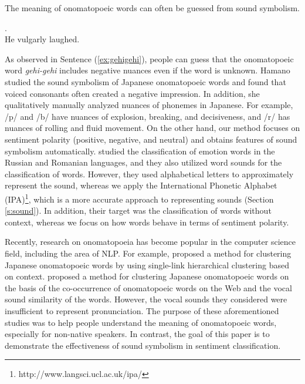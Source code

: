 \documentclass[english]{jnlp_1.4}
\begin{document}
The meaning of onomatopoeic words can often be guessed from sound symbolism.
\begin{exe}
	.\\
	\hspace{5mm}He \hspace{5mm}vulgarly \hspace{2mm}laughed.
	\label{ex:gehigehi}
\end{exe}
As observed in Sentence (\ref{ex:gehigehi}), people can guess that the onomatopoeic word {\it gehi-gehi} includes negative nuances even if the word is unknown.
Hamano \cite{hamano1998} studied the sound symbolism of Japanese onomatopoeic words and found that
voiced consonants often created a negative impression.
In addition, she qualitatively manually analyzed nuances of phonemes in Japanese.
For example, /p/ and /b/ have nuances of explosion, breaking, and decisiveness, and /r/ has nuances of rolling and fluid movement.
On the other hand, our method focuses on sentiment polarity (positive, negative, and neutral) and obtains features of sound symbolism automatically.
\cite{sokolova2009} studied the classification of emotion words in the Russian and Romanian languages, and
they also utilized word sounds for the classification of words.
However, they used alphabetical letters to approximately represent the sound,
whereas we apply the International Phonetic Alphabet (IPA)\footnote{http://www.langsci.ucl.ac.uk/ipa/},
which is a more accurate approach to representing sounds (Section \ref{s:sound}).
In addition, their target was the classification of words without context, whereas we focus on how words behave in terms of sentiment polarity.

Recently, research on onomatopoeia has become popular in the  computer science field, including the area of NLP.
For example, \cite{komiya2011} proposed a method for clustering Japanese onomatopoeic words by using single-link hierarchical clustering based on context.
\cite{ichioka2008} proposed a method for clustering Japanese onomatopoeic words on the basis of the co-occurrence of onomatopoeic words on the Web and the vocal sound similarity of the words.
However, the vocal sounds they considered were insufficient to represent pronunciation.
The purpose of these aforementioned studies was to help people understand the meaning of onomatopoeic words, especially for non-native speakers.
In contrast, the goal of this paper is to demonstrate the effectiveness of sound symbolism in sentiment classification.
\end{document}
